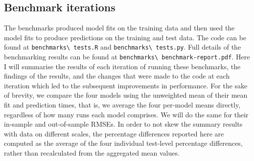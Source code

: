 \documentclass[10pt]{article}
\begin{document}
\subsection{Benchmark iterations}
The benchmarks produced model fits on the training data and then used the model fits to produce predictions on the training and test data. The code can be found at \nolinkurl{benchmarks\ tests.R} and \nolinkurl{benchmarks\ tests.py}\cite{repo}. Full details of the benchmarking results can be found at \nolinkurl{benchmarks\ benchmark-report.pdf}\cite{repo}. Here I will summarise the results of each iteration of running these benchmarks, the findings of the results, and the changes that were made to the code at each iteration which led to the subsequent improvements in performance. For the sake of brevity, we compare the four models using the unweighted mean of their mean fit and prediction times, that is, we average the four per-model means directly, regardless of how many runs each model comprises. We will do the same for their in-sample and out-of-sample RMSEs. In order to not skew the summary results with data on different scales, the percentage differences reported here are computed as the average of the four individual test-level percentage differences, rather than recalculated from the aggregated mean values.
\end{document}
